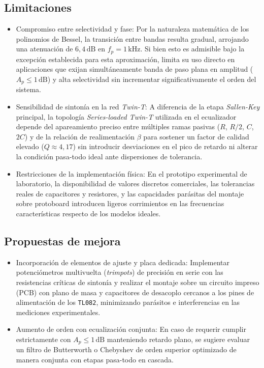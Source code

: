 \documentclass[12pt]{article}
\begin{document}
\begin{itemize}
\subsection*{Limitaciones}
\begin{itemize}
    \item {Compromiso entre selectividad y fase:} Por la naturaleza matemática de los polinomios de Bessel, la transición entre bandas resulta gradual, arrojando una atenuación de $6,4\,\text{dB}$ en $f_p = 1\,\text{kHz}$. Si bien esto es admisible bajo la excepción establecida para esta aproximación, limita su uso directo en aplicaciones que exijan simultáneamente banda de paso plana en amplitud ($A_p \le 1\,\text{dB}$) y alta selectividad sin incrementar significativamente el orden del sistema.
    \item {Sensibilidad de sintonía en la red \textit{Twin-T}:} A diferencia de la etapa \textit{Sallen-Key} principal, la topología \textit{Series-loaded Twin-T} utilizada en el ecualizador depende del apareamiento preciso entre múltiples ramas pasivas ($R$, $R/2$, $C$, $2C$) y de la relación de realimentación $\beta$ para sostener un factor de calidad elevado ($Q \approx 4,17$) sin introducir desviaciones en el pico de retardo ni alterar la condición pasa-todo ideal ante dispersiones de tolerancia.
    \item {Restricciones de la implementación física:} En el prototipo experimental de laboratorio, la disponibilidad de valores discretos comerciales, las tolerancias reales de capacitores y resistores, y las capacidades parásitas del montaje sobre protoboard introducen ligeros corrimientos en las frecuencias características respecto de los modelos ideales.
\end{itemize}

\subsection*{Propuestas de mejora}
\begin{itemize}
    \item {Incorporación de elementos de ajuste y placa dedicada:} Implementar potenciómetros multivuelta (\textit{trimpots}) de precisión en serie con las resistencias críticas de sintonía y realizar el montaje sobre un circuito impreso (PCB) con plano de masa y capacitores de desacoplo cercanos a los pines de alimentación de los \texttt{TL082}, minimizando parásitos e interferencias en las mediciones experimentales.
    \item {Aumento de orden con ecualización conjunta:} En caso de requerir cumplir estrictamente con $A_p \le 1\,\text{dB}$ manteniendo retardo plano, se sugiere evaluar un filtro de Butterworth o Chebyshev de orden superior optimizado de manera conjunta con etapas pasa-todo en cascada.
\end{itemize}


\end{itemize}
\end{document}
